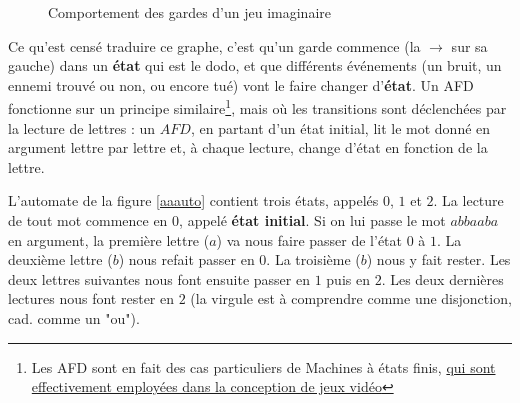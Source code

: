 \begin{figure}[!h]
\centering
{}
\caption{Comportement des gardes d'un jeu imaginaire}
\label{garde}
\end{figure}

Ce qu'est censé traduire ce graphe, c'est qu'un garde commence (la $\rightarrow$ sur sa gauche) dans un \textbf{état} qui est le dodo, et que différents événements (un bruit, un ennemi trouvé ou non, ou encore tué) vont le faire changer d'\textbf{état}. Un AFD fonctionne sur un principe similaire\footnote{Les AFD sont en fait des cas particuliers de Machines à états finis, \href{https://www.youtube.com/watch?v=JyF0oyarz4U}{qui sont effectivement employées dans la conception de jeux vidéo}}, mais où les transitions sont déclenchées par la lecture de lettres : un $AFD$, en partant d'un état initial, lit le mot donné en argument lettre par lettre et, à chaque lecture, change d'état en fonction de la lettre. 

\begin{example}
L'automate de la figure \ref{aaauto} contient trois états, appelés $0$, $1$ et $2$. La lecture de tout mot commence en $0$, appelé \textbf{état initial}. Si on lui passe le mot $abbaaba$ en argument, la première lettre ($a$) va nous faire passer de l'état $0$ à $1$. La deuxième lettre ($b$) nous refait passer en $0$. La troisième ($b$) nous y fait rester. Les deux lettres suivantes nous font ensuite passer en $1$ puis en $2$. Les deux dernières lectures nous font rester en $2$ (la virgule est à comprendre comme une disjonction, cad. comme un "ou").
\end{example}



